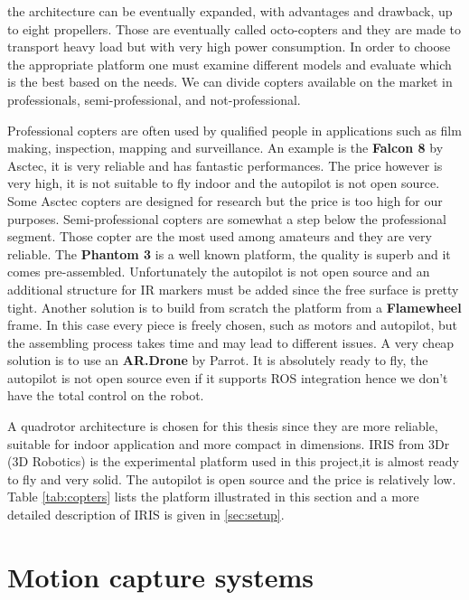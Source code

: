 the architecture can be eventually expanded, with advantages and drawback, up to eight propellers. Those are eventually called octo-copters and they are made to transport heavy load but with very high power consumption. In order to choose the appropriate platform one must examine different models and evaluate which is the best based on the needs. We can divide copters available on the market in professionals, semi-professional, and not-professional.\par Professional copters are often used by qualified people in applications such as film making, inspection, mapping and surveillance. An example is the\textbf{ Falcon 8} by Asctec, it is very reliable and has fantastic performances. The price however is very high, it is not suitable to fly indoor and the autopilot is not open source. Some Asctec copters are designed for research but the price is too high for our purposes. Semi-professional copters are somewhat a step below the professional segment. Those copter are the most used among amateurs and they are very reliable. The \textbf{Phantom 3} is a well known platform, the quality is superb and it comes pre-assembled. Unfortunately the autopilot is not open source and an additional structure for IR markers must be added since the free surface is pretty tight. Another solution is to build from scratch the platform from a \textbf{Flamewheel} frame. In this case every piece is freely chosen, such as motors and autopilot, but the assembling process takes time and may lead to different issues. A very cheap solution is to use an \textbf{AR.Drone} by Parrot. It is absolutely ready to fly, the autopilot is not open source even if it supports ROS integration hence we don't have the total control on the robot.
\par A quadrotor architecture is chosen for this thesis since they are more reliable, suitable for indoor application and more compact in  dimensions. IRIS from 3Dr (3D Robotics) is the experimental platform used in this project,it is almost ready to fly and very solid. The autopilot is open source and the price is relatively low. Table \ref{tab:copters} lists the platform illustrated in this section and a more detailed description of IRIS is given in \ref{sec:setup}.

\section{Motion capture systems}

